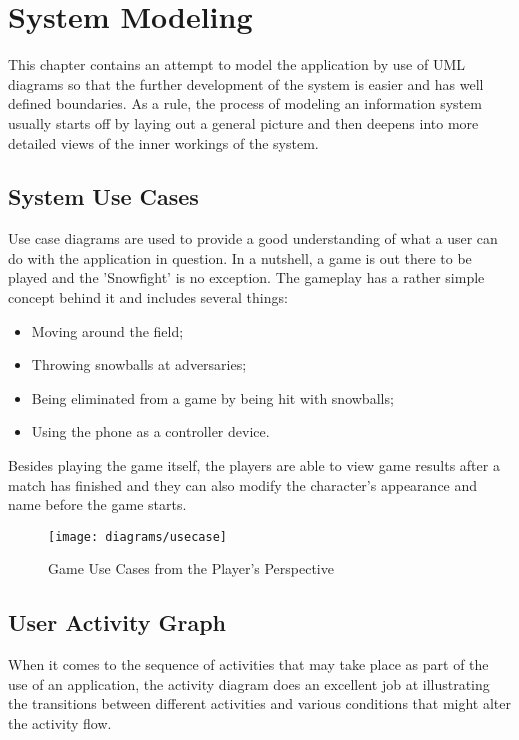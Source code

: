 \section{System Modeling}


This chapter contains an attempt to model the application by use of UML
diagrams so that the further development of the system is easier and has well
defined boundaries. As a rule, the process of modeling an information system
usually starts off by laying out a general picture and then deepens into more
detailed views of the inner workings of the system.


\subsection{System Use Cases}

Use case diagrams are used to provide a good understanding of what a user can
do with the application in question. In a nutshell, a game is out there to be
played and the 'Snowfight' is no exception. The gameplay has a rather simple
concept behind it and includes several things:

\begin{itemize}
	\item Moving around the field;
	\item Throwing snowballs at adversaries;
	\item Being eliminated from a game by being hit with snowballs;
	\item Using the phone as a controller device.
\end{itemize}

Besides playing the game itself, the players are able to view game results after
a match has finished and they can also modify the character's appearance and
name before the game starts.

\begin{figure}[!h]
\centering
\texttt{[image: diagrams/usecase]}
\caption{Game Use Cases from the Player's Perspective}\label{diag:usecase}
\end{figure}

\newpage

\subsection{User Activity Graph}

When it comes to the sequence of activities that may take place as part of the
use of an application, the activity diagram does an excellent job at
illustrating the transitions between different activities and various conditions
that might alter the activity flow.


